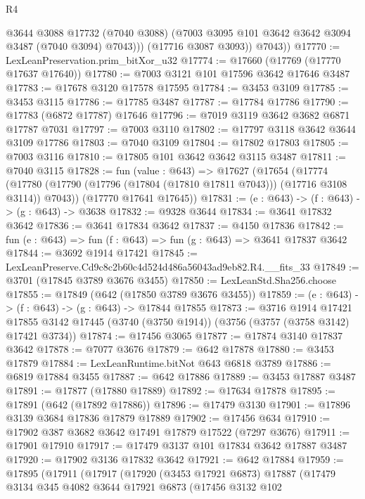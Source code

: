 \begin{lexlean}{R4}
\begin{coremodule}
              @3644
              @3088
              @17732
              (@7040 @3088)
              (@7003 @3095 @101 @3642 @3642 @3094 @3487 (@7040 @3094) @7043)))
          (@17716 @3087 @3093))
        @7043))
@17770 := LexLeanPreservation.prim_bitXor_u32
@17774 := @17660 (@17769 (@17770 @17637 @17640))
@17780 := @7003 @3121 @101 @17596 @3642 @17646 @3487
@17783 := @17678 @3120 @17578 @17595
@17784 := @3453 @3109
@17785 := @3453 @3115
@17786 := @17785 @3487
@17787 := @17784 @17786
@17790 := @17783 (@6872 @17787) @17646
@17796 := @7019 @3119 @3642 @3682 @6871 @17787 @7031
@17797 := @7003 @3110
@17802 := @17797 @3118 @3642 @3644 @3109 @17786
@17803 := @7040 @3109
@17804 := @17802 @17803
@17805 := @7003 @3116
@17810 := @17805 @101 @3642 @3642 @3115 @3487
@17811 := @7040 @3115
@17828 := fun (value : @643) =>
  @17627
    (@17654
      (@17774 (@17780 (@17790 (@17796 (@17804 (@17810 @17811 @7043))) (@17716 @3108 @3114)) @7043))
      (@17770 @17641 @17645))
@17831 := (e : @643) -> (f : @643) -> (g : @643) -> @3638
@17832 := @9328 @3644
@17834 := @3641 @17832 @3642
@17836 := @3641 @17834 @3642
@17837 := @4150 @17836
@17842 := fun (e : @643) => fun (f : @643) => fun (g : @643) => @3641 @17837 @3642
@17844 := @3692 @1914 @17421
@17845 := LexLeanPreserve.Cd9c8c2b60c4d524d486a56043ad9eb82.R4.__fits_33
@17849 := @3701 (@17845 @3789 @3676 @3455)
@17850 := LexLeanStd.Sha256.choose
@17855 := @17849 (@642 (@17850 @3789 @3676 @3455))
@17859 := (e : @643) -> (f : @643) -> (g : @643) -> @17844 @17855
@17873 := @3716
    @1914
    @17421
    @17855
    @3142
    @17445
    (@3740 (@3750 @1914))
    (@3756 (@3757 (@3758 @3142) @17421 @3734))
@17874 := @17456 @3065
@17877 := @17874 @3140 @17837 @3642
@17878 := @7077 @3676
@17879 := @642 @17878
@17880 := @3453 @17879
@17884 := LexLeanRuntime.bitNot @643 @6818 @3789
@17886 := @6819 @17884 @3455
@17887 := @642 @17886
@17889 := @3453 @17887 @3487
@17891 := @17877 (@17880 @17889)
@17892 := @17634 @17878
@17895 := @17891 (@642 (@17892 @17886))
@17896 := @17479 @3130
@17901 := @17896 @3139 @3684 @17836 @17879 @17889
@17902 := @17456 @634
@17910 := @17902 @387 @3682 @3642 @17491 @17879 @17522 (@7297 @3676)
@17911 := @17901 @17910
@17917 := @17479 @3137 @101 @17834 @3642 @17887 @3487
@17920 := @17902 @3136 @17832 @3642
@17921 := @642 @17884
@17959 := @17895
    (@17911
      (@17917
        (@17920
          (@3453 @17921 @6873)
          @17887
          (@17479
            @3134
            @345
            @4082
            @3644
            @17921
            @6873
            (@17456
              @3132
              @102

\end{coremodule}
\end{lexlean}
